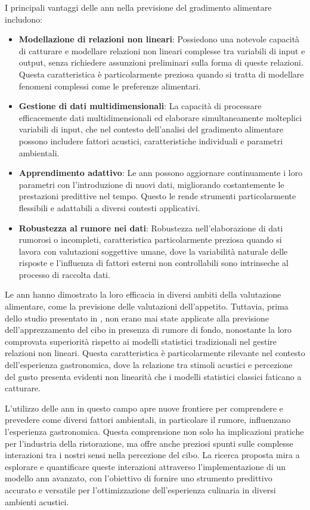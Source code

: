 I principali vantaggi delle \gls{ann} nella previsione del gradimento alimentare includono:

\begin{itemize}
    \item \textbf{Modellazione di relazioni non lineari}: Possiedono una notevole capacità di catturare e modellare relazioni non lineari complesse tra variabili di input e output, senza richiedere assunzioni preliminari sulla forma di queste relazioni. Questa caratteristica è particolarmente preziosa quando si tratta di modellare fenomeni complessi come le preferenze alimentari.
    \item \textbf{Gestione di dati multidimensionali}: La  capacità di processare efficacemente dati multidimensionali ed elaborare simultaneamente molteplici variabili di input, che nel contesto dell'analisi del gradimento alimentare possono includere fattori acustici, caratteristiche individuali e parametri ambientali.
    \item \textbf{Apprendimento adattivo}: Le \gls{ann} possono aggiornare continuamente i loro parametri con l'introduzione di nuovi dati, migliorando costantemente le prestazioni predittive nel tempo. Questo le rende strumenti particolarmente flessibili e adattabili a diversi contesti applicativi.
    \item \textbf{Robustezza al rumore nei dati}: Robustezza nell'elaborazione di dati rumorosi o incompleti, caratteristica particolarmente preziosa quando si lavora con valutazioni soggettive umane, dove la variabilità naturale delle risposte e l'influenza di fattori esterni non controllabili sono intrinseche al processo di raccolta dati.
\end{itemize}

Le \gls{ann} hanno dimostrato la loro efficacia in diversi ambiti della valutazione alimentare, come la previsione delle valutazioni dell'appetito. Tuttavia, prima dello studio presentato in \cite{alamir2021enhanced}, non erano mai state applicate alla previsione dell'apprezzamento del cibo in presenza di rumore di fondo, nonostante la loro comprovata superiorità rispetto ai modelli statistici tradizionali nel gestire relazioni non lineari. Questa caratteristica è particolarmente rilevante nel contesto dell'esperienza gastronomica, dove la relazione tra stimoli acustici e percezione del gusto presenta evidenti non linearità che i modelli statistici classici faticano a catturare.

L'utilizzo delle \gls{ann} in questo campo apre nuove frontiere per comprendere e prevedere come diversi fattori ambientali, in particolare il rumore, influenzano l'esperienza gastronomica. Questa comprensione non solo ha implicazioni pratiche per l'industria della ristorazione, ma offre anche preziosi spunti sulle complesse interazioni tra i nostri sensi nella percezione del cibo. La ricerca proposta mira a esplorare e quantificare queste interazioni attraverso l'implementazione di un modello \gls{ann} avanzato, con l'obiettivo di fornire uno strumento predittivo accurato e versatile per l'ottimizzazione dell'esperienza culinaria in diversi ambienti acustici.

